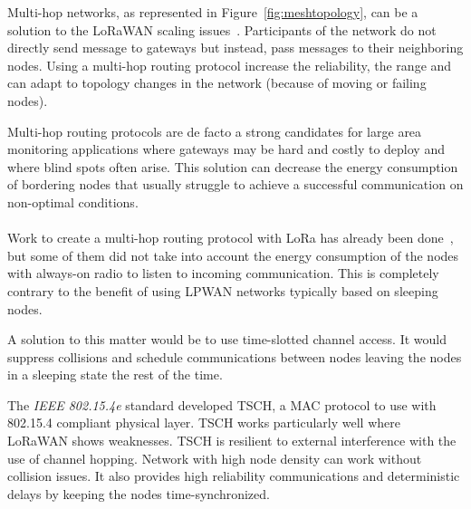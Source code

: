 


Multi-hop networks, as represented in Figure~\ref{fig:meshtopology}, can be a solution to
the LoRaWAN scaling issues~\cite{8115756}.
Participants of the network do not directly send message to gateways but
instead, pass messages to their neighboring nodes.
Using a multi-hop routing protocol increase the reliability, the range
and can adapt to topology changes in the network (because of moving or failing nodes).

Multi-hop routing protocols are de facto a strong candidates for large area monitoring 
applications where gateways may be hard and costly to deploy and where blind
spots often arise.
This solution can decrease the energy consumption of bordering nodes that
usually struggle to achieve a successful communication on non-optimal
conditions.

\paragraph{}

Work to create a multi-hop routing protocol with LoRa has already been
done~\cite{8115756, DIAS2018424, 8856256, Abrardo_2019, duong2018}, 
but some of them did not take into account the energy consumption of the nodes
with always-on radio to listen to incoming communication.
This is completely contrary to the benefit of using LPWAN networks typically
based on sleeping nodes.

A solution to this matter would be to use time-slotted channel access.
It would suppress collisions and schedule communications between nodes leaving
the nodes in a sleeping state the rest of the time.

The \emph{IEEE 802.15.4e} standard developed TSCH, a MAC
protocol to use with 802.15.4 compliant physical layer.
TSCH works particularly well where LoRaWAN shows weaknesses. 
TSCH is resilient to external interference with the use of channel hopping.
Network with high node density can work without collision issues.
It also provides high reliability communications and deterministic delays by 
keeping the nodes time-synchronized.

